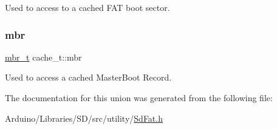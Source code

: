 Used to access to a cached F\+AT boot sector. \mbox{\label{unioncache__t_a6ac10bfb1ebb1139c448456679663bb6}} 
\subsubsection{\texorpdfstring{mbr}{mbr}}
{\footnotesize\ttfamily \hyperlink{_fat_structs_8h_a7c429e5097f101c8c97663d6c4155bd9}{mbr\+\_\+t} cache\+\_\+t\+::mbr}

Used to access a cached Master\+Boot Record. 

The documentation for this union was generated from the following file\+:\begin{DoxyCompactItemize}
\item 
Arduino/\+Libraries/\+S\+D/src/utility/\hyperlink{_sd_fat_8h}{Sd\+Fat.\+h}\end{DoxyCompactItemize}
